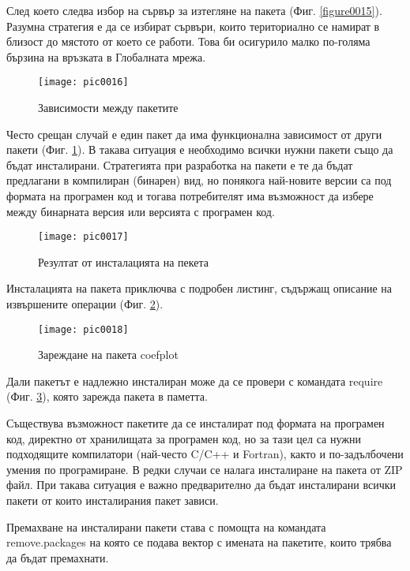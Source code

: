 След което следва избор на сървър за изтегляне на пакета (Фиг. \ref{figure0015}). Разумна стратегия е да се избират сървъри, които териториално се намират в близост до мястото от което се работи. Това би осигурило малко по-голяма бързина на връзката в Глобалната мрежа. 

\begin{figure}[h!]
  \centering
  \texttt{[image: pic0016]}
  \caption{Зависимости между пакетите}
\label{figure0016}
\end{figure}
\FloatBarrier

Често срещан случай е един пакет да има функционална зависимост от други пакети (Фиг. \ref{figure0016}). В такава ситуация е необходимо всички нужни пакети също да бъдат инсталирани. Стратегията при разработка на пакети е те да бъдат предлагани в компилиран (бинарен) вид, но понякога най-новите версии са под формата на програмен код и тогава потребителят има възможност да избере между бинарната версия или версията с програмен код. 

\begin{figure}[h!]
  \centering
  \texttt{[image: pic0017]}
  \caption{Резултат от инсталацията на пекета}
\label{figure0017}
\end{figure}
\FloatBarrier

Инсталацията на пакета приключва с подробен листинг, съдържащ описание на извършените операции (Фиг. \ref{figure0017}). 

\begin{figure}[h!]
  \centering
  \texttt{[image: pic0018]}
  \caption{Зареждане на пакета coefplot}
\label{figure0018}
\end{figure}
\FloatBarrier

Дали пакетът е надлежно инсталиран може да се провери с командата require (Фиг. \ref{figure0018}), която зарежда пакета в паметта. 

Съществува възможност пакетите да се инсталират под формата на програмен код, директно от хранилищата за програмен код, но за тази цел са нужни подходящите компилатори (най-често C/C++ и Fortran), както и по-задълбочени умения по програмиране. В редки случаи се налага инсталиране на пакета от ZIP файл. При такава ситуация е важно предварително да бъдат инсталирани всички пакети от които инсталирания пакет зависи. 

Премахване на инсталирани пакети става с помощта на командата remove.packages на която се подава вектор с имената на пакетите, които трябва да бъдат премахнати.

